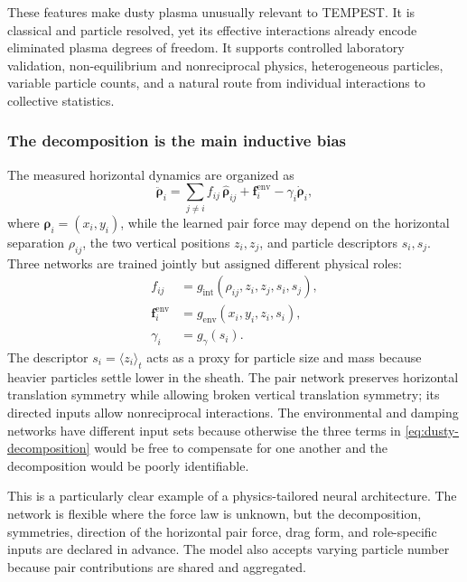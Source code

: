 These features make dusty plasma unusually relevant to TEMPEST. It is classical and particle resolved, yet its effective interactions already encode eliminated plasma degrees of freedom. It supports controlled laboratory validation, non-equilibrium and nonreciprocal physics, heterogeneous particles, variable particle counts, and a natural route from individual interactions to collective statistics.

\subsubsection{The decomposition is the main inductive bias}

The measured horizontal dynamics are organized as
\begin{equation}
\ddot{\bm\rho}_i
=
\sum_{j\ne i}
f_{ij}\,\widehat{\bm\rho}_{ij}
+\bm f_i^{\mathrm{env}}
-\gamma_i\dot{\bm\rho}_i,
\label{eq:dusty-decomposition}
\end{equation}
where \(\bm\rho_i=(x_i,y_i)\), while the learned pair force may depend on the horizontal separation \(\rho_{ij}\), the two vertical positions \(z_i,z_j\), and particle descriptors \(s_i,s_j\). Three networks are trained jointly but assigned different physical roles:
\begin{align}
f_{ij}
&=
g_{\mathrm{int}}(\rho_{ij},z_i,z_j,s_i,s_j),\\
\bm f_i^{\mathrm{env}}
&=
g_{\mathrm{env}}(x_i,y_i,z_i,s_i),\\
\gamma_i
&=
g_{\gamma}(s_i).
\end{align}
The descriptor \(s_i=\langle z_i\rangle_t\) acts as a proxy for particle size and mass because heavier particles settle lower in the sheath. The pair network preserves horizontal translation symmetry while allowing broken vertical translation symmetry; its directed inputs allow nonreciprocal interactions. The environmental and damping networks have different input sets because otherwise the three terms in \cref{eq:dusty-decomposition} would be free to compensate for one another and the decomposition would be poorly identifiable.

This is a particularly clear example of a physics-tailored neural architecture. The network is flexible where the force law is unknown, but the decomposition, symmetries, direction of the horizontal pair force, drag form, and role-specific inputs are declared in advance. The model also accepts varying particle number because pair contributions are shared and aggregated.

